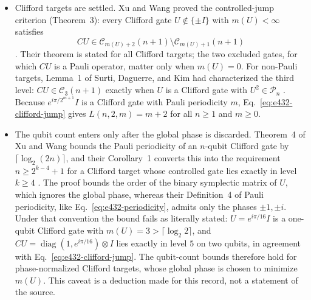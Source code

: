 \begin{itemize}
  \item Clifford targets are settled.  Xu and Wang proved the controlled-jump
  criterion (Theorem~3): every Clifford gate $U\notin\{\pm I\}$ with
  $m(U)<\infty$ satisfies
  \begin{equation}
    CU\in\mathcal C_{m(U)+2}(n+1)\setminus\mathcal C_{m(U)+1}(n+1)
    \label{eq:e432-clifford-jump}
  \end{equation}
  .  Their theorem is stated for all
  Clifford targets; the two excluded gates, for which $CU$ is a Pauli
  operator, matter only when $m(U)=0$.  For non-Pauli targets, Lemma~1 of
  Surti, Daguerre, and Kim had characterized the third level:
  $CU\in\mathcal C_3(n+1)$ exactly when $U$ is a Clifford gate with
  $U^2\in\mathcal P_n$ .
  Because $e^{i\pi/2^{m+1}}I$ is a Clifford gate with Pauli periodicity $m$,
  Eq.~\eqref{eq:e432-clifford-jump} gives $L(n,2,m)=m+2$ for all $n\geq1$ and
  $m\geq0$.

  \item The qubit count enters only after the global phase is discarded.
  Theorem~4 of Xu and Wang bounds the Pauli periodicity of an $n$-qubit
  Clifford gate by $\lceil\log_2(2n)\rceil$, and their Corollary~1 converts
  this into the requirement $n\geq2^{k-4}+1$ for a Clifford target whose
  controlled gate lies exactly in level $k\geq4$
  .  The proof bounds the order of the
  binary symplectic matrix of $U$, which ignores the global phase, whereas
  their Definition~4 of Pauli periodicity, like
  Eq.~\eqref{eq:e432-periodicity}, admits only the phases $\pm1,\pm i$.  Under
  that convention the bound fails as literally stated: $U=e^{i\pi/16}I$ is a
  one-qubit Clifford gate with $m(U)=3>\lceil\log_2 2\rceil$, and
  $CU=\operatorname{diag}(1,e^{i\pi/16})\otimes I$ lies exactly in level $5$
  on two qubits, in agreement with Eq.~\eqref{eq:e432-clifford-jump}.  The
  qubit-count bounds therefore hold for phase-normalized Clifford targets,
  whose global phase is chosen to minimize $m(U)$.  This caveat is a deduction
  made for this record, not a statement of the source.


\end{itemize}
